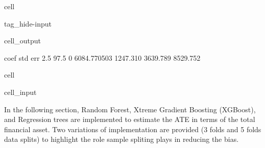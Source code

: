 \documentclass[letterpaper,10pt,english]{jupyterBook}
\begin{document}
\begin{sphinxuseclass}{cell}
\begin{sphinxuseclass}{tag_hide-input}\begin{sphinxVerbatimOutput}

\begin{sphinxuseclass}{cell_output}
\begin{sphinxVerbatim}[commandchars=\\\{\}]
          coef    std err      2.5 \PYGZpc{}     97.5 \PYGZpc{}
0  6084.770503   1247.310   3639.789   8529.752
\end{sphinxVerbatim}

\end{sphinxuseclass}\end{sphinxVerbatimOutput}

\end{sphinxuseclass}
\end{sphinxuseclass}
\begin{sphinxuseclass}{cell}\begin{sphinxVerbatimInput}

\begin{sphinxuseclass}{cell_input}
\begin{sphinxVerbatim}[commandchars=\\\{\}]
  
\end{sphinxVerbatim}

\end{sphinxuseclass}\end{sphinxVerbatimInput}

\end{sphinxuseclass}
\sphinxAtStartPar
In the following section, Random Forest, Xtreme Gradient Boosting (XGBoost), and Regression trees are implemented to estimate the ATE in terms of the total financial asset. Two variations of implementation are provided (3 folds and 5 folds data splits) to highlight the role sample spliting plays in reducing the bias.
\end{document}
